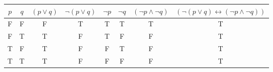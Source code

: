 \begin{tabular}{|c|c||c|c|c|c|c|c|}
\hline
$ p $ & $ q $ & $ (p \vee q) $ & $  \neg (p \vee q) $ & $  \neg p $ & $  \neg q $ & $ ( \neg p \wedge  \neg q) $ & $ ( \neg (p \vee q) \leftrightarrow ( \neg p \wedge  \neg q)) $ \\
\hline
F & F & F & T & T & T & T & T \\
F & T & T & F & T & F & F & T \\
T & F & T & F & F & T & F & T \\
T & T & T & F & F & F & F & T \\
\hline
\end{tabular}
